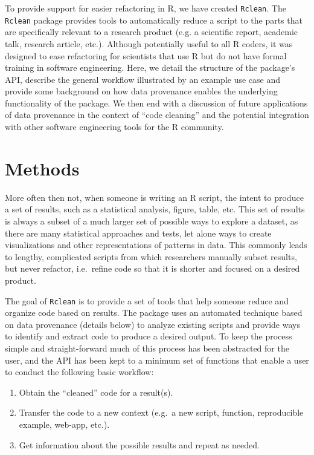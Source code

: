 \documentclass[]{article}
\providecommand{\tightlist}{%
  \setlength{\itemsep}{0pt}\setlength{\parskip}{0pt}}
\begin{document}
To provide support for easier refactoring in R, we have created
\texttt{Rclean}. The \texttt{Rclean} package provides tools to
automatically reduce a script to the parts that are specifically
relevant to a research product (e.g. a scientific report, academic talk,
research article, etc.). Although potentially useful to all R coders, it
was designed to ease refactoring for scientists that use R but do not
have formal training in software engineering. Here, we detail the
structure of the package's API, describe the general workflow
illustrated by an example use case and provide some background on how
data provenance enables the underlying functionality of the package. We
then end with a discussion of future applications of data provenance in
the context of ``code cleaning'' and the potential integration with
other software engineering tools for the R community.

\section{Methods}\label{methods}

More often then not, when someone is writing an R script, the intent to
produce a set of results, such as a statistical analysis, figure, table,
etc. This set of results is always a subset of a much larger set of
possible ways to explore a dataset, as there are many statistical
approaches and tests, let alone ways to create visualizations and other
representations of patterns in data. This commonly leads to lengthy,
complicated scripts from which researchers manually subset results, but
never refactor, i.e.~refine code so that it is shorter and focused on a
desired product.

The goal of \texttt{Rclean} is to provide a set of tools that help
someone reduce and organize code based on results. The package uses an
automated technique based on data provenance (details below) to analyze
existing scripts and provide ways to identify and extract code to
produce a desired output. To keep the process simple and
straight-forward much of this process has been abstracted for the user,
and the API has been kept to a minimum set of functions that enable a
user to conduct the following basic workflow:

\begin{enumerate}
\def\labelenumi{\arabic{enumi}.}
\tightlist
\item
  Obtain the ``cleaned'' code for a result(s).
\item
  Transfer the code to a new context (e.g.~a new script, function,
  reproducible example, web-app, etc.).
\item
  Get information about the possible results and repeat as needed.
\end{enumerate}
\end{document}
